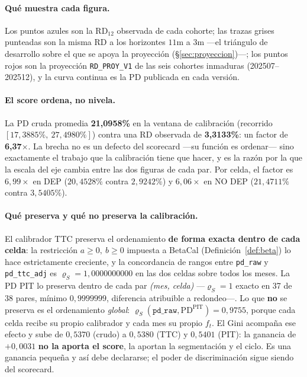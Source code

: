 \documentclass[12pt, a4paper]{article}
\newcommand{\PDPIT}{\ensuremath{\mathrm{PD}^{\mathrm{PIT}}}}
\newcommand{\RD}{\ensuremath{\mathrm{RD}}}
\renewcommand{\rho}{\ensuremath{\varrho}}
\newcommand{\ft}{\ensuremath{f_t}}
\begin{document}
\paragraph{Qué muestra cada figura.} Los puntos azules son la \RD$_{12}$ observada de cada cohorte;
las trazas grises punteadas son la misma RD a los horizontes $11$m a $3$m ---el triángulo de
desarrollo sobre el que se apoya la proyección (\S\ref{sec:proyeccion})---; los puntos rojos son la
proyección \texttt{RD\_PROY\_V1} de las seis cohortes inmaduras (202507--202512), y la curva
continua es la PD publicada en cada versión.

\paragraph{El score ordena, no nivela.} La PD cruda promedia \textbf{21{,}0958\%} en la ventana de
calibración (recorrido $[17{,}3885\%,\ 27{,}4980\%]$) contra una RD observada de
\textbf{3{,}3133\%}: un factor de \textbf{6{,}37$\times$}. La brecha no es un defecto del scorecard
---su función es ordenar--- sino exactamente el trabajo que la calibración tiene que hacer, y es la
razón por la que la escala del eje cambia entre las dos figuras de cada par. Por celda, el factor es
$6{,}99\times$ en DEP ($20{,}4528\%$ contra $2{,}9242\%$) y $6{,}06\times$ en NO DEP ($21{,}4711\%$
contra $3{,}5405\%$).

\paragraph{Qué preserva y qué no preserva la calibración.} El calibrador TTC preserva el
ordenamiento \textbf{de forma exacta dentro de cada celda}: la restricción $a\ge0,\ b\ge0$ impuesta
a BetaCal (Definición~\ref{def:beta}) lo hace estrictamente creciente, y la concordancia de rangos entre
\texttt{pd\_raw} y \texttt{pd\_ttc\_adj} es $\rho_S=1{,}0000000000$ en las dos celdas sobre todos
los meses. La PD PIT lo preserva dentro de cada par \emph{(mes, celda)} ---$\rho_S=1$ exacto en 37
de 38 pares, mínimo $0{,}9999999$, diferencia atribuible a redondeo---. Lo que \textbf{no} se
preserva es el ordenamiento \emph{global}: $\rho_S(\texttt{pd\_raw},\PDPIT)=0{,}9755$, porque cada
celda recibe su propio calibrador y cada mes su propio $\ft$. El Gini acompaña ese efecto y sube de
$0{,}5370$ (crudo) a $0{,}5380$ (TTC) y $0{,}5401$ (PIT): la ganancia de $+0{,}0031$ \textbf{no la
aporta el score}, la aportan la segmentación y el ciclo. Es una ganancia pequeña y así debe
declararse; el poder de discriminación sigue siendo del scorecard.
\end{document}
